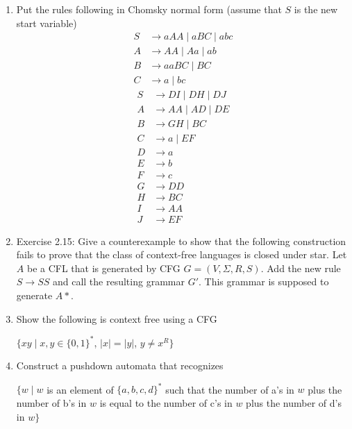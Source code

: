 \documentclass{article}
\begin{document}
\begin{enumerate}
        \item Put the rules following in Chomsky normal form (assume that $S$ is the new start variable)
            \begin{align*}
                S&\rightarrow aAA \mid aBC \mid abc\\
                A&\rightarrow AA \mid Aa \mid ab\\
                B&\rightarrow aaBC \mid BC\\
                C&\rightarrow a\mid bc
            \end{align*}
            \begin{align*}
                S&\rightarrow DI \mid DH \mid DJ\\
                A&\rightarrow AA \mid AD \mid DE\\
                B&\rightarrow GH \mid BC\\
                C&\rightarrow a \mid EF\\
                D&\rightarrow a\\
                E&\rightarrow b\\
                F&\rightarrow c\\
                G&\rightarrow DD\\
                H&\rightarrow BC\\
                I&\rightarrow AA\\
                J&\rightarrow EF
            \end{align*}
        \item Exercise 2.15: Give a counterexample to show that the following construction fails to prove that the class of context-free languages
            is closed under star. Let $A$ be a CFL that is generated by CFG $G=(V,\Sigma, R,S)$. Add the new rule $S\rightarrow SS$ and call the 
            resulting grammar $G'$. This grammar is supposed to generate $A*$.

        \item Show the following is context free using a CFG
            \begin{center}
                $\{xy \mid x,y\in \{0,1\}^*$, $ |x|=|y|$, $ y\not= x^R\}$
            \end{center}

        \item Construct a pushdown automata that recognizes
            \begin{center}
                $\{w\mid w $ is an element of $\{a,b,c,d\}^* $ such that the number of a's in $w$ plus the number of b's in $w$ is equal to the number of c's in $w$ plus the number of d's in $w \}$
            \end{center}
    \end{enumerate}
\end{document}
